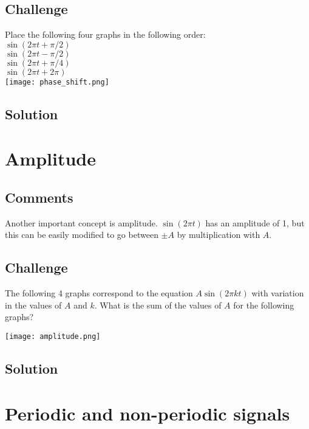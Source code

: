 \subsection*{Challenge}
Place the following four graphs in the following order:\\
$\sin(2 \pi t + \pi/2)$\\
$\sin(2 \pi t - \pi/2)$\\
$\sin(2 \pi t + \pi/4)$\\
$\sin(2 \pi t + 2 \pi)$\\

\texttt{[image: phase\_shift.png]}

\subsection*{Solution}



\newpage
\section{Amplitude}

\subsection*{Comments}
Another important concept is amplitude. $\sin(2 \pi t)$ has an amplitude of 1, but this can be easily modified to go between $\pm A$ by multiplication with $A$.

\subsection*{Challenge}
The following 4 graphs correspond to the equation $A \sin(2 \pi k t)$ with variation in the values of $A$ and $k$. What is the sum of the values of $A$ for the following graphs? 

\texttt{[image: amplitude.png]}

\subsection*{Solution}




\newpage
\section{Periodic and non-periodic signals}
\label{sec:periodic}

